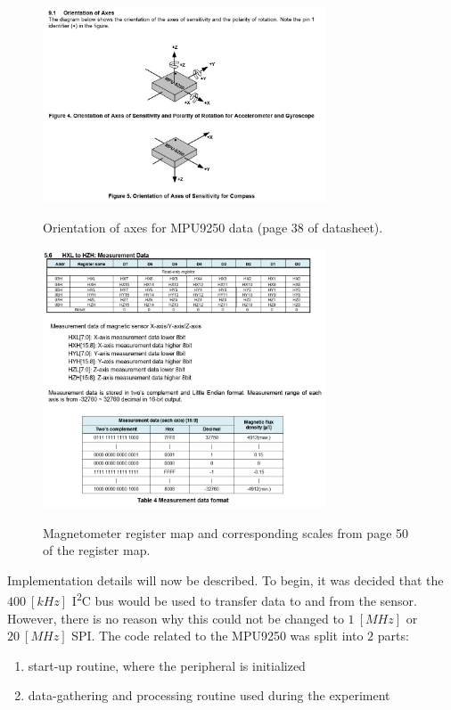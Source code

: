 \documentclass{article}
\begin{document}
\begin{figure}[!ht]
	\centering
	\includegraphics[width=0.75\textwidth]{images/MPU9250_axisOrientation}
	\label{MPUAxisOrientation}
	\caption{Orientation of axes for MPU9250 data (page 38 of datasheet).}
\end{figure}


\begin{figure}[!ht]
	\centering
	\includegraphics[width=0.75\textwidth]{images/MPU9250_magnetometerRegs}
	\label{MPUMagRegs}
	\caption{Magnetometer register map and corresponding scales from page 50 of the register map.}
\end{figure}

\clearpage

Implementation details will now be described. To begin, it was decided that the $400 \ [kHz]$ I\textsuperscript{2}C bus would be used to transfer data to and from the sensor. However, there is no reason why this could not be changed to $1 \ [MHz]$ or $20 \ [MHz]$ SPI. The code related to the MPU9250 was split into $2$ parts:
\begin{enumerate}
	\item start-up routine, where the peripheral is initialized
	
	\item data-gathering and processing routine used during the experiment
\end{enumerate}
\end{document}
